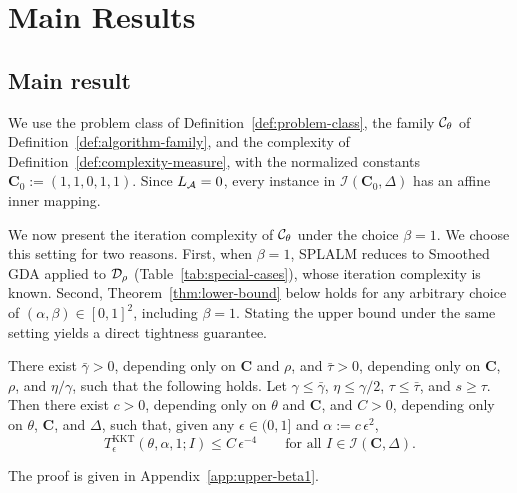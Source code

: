 \section{Main Results}
\label{sec:lower-bound}

\subsection{Main result}
\label{subsec:lb-main}

We use the problem class of Definition~\ref{def:problem-class}, the family
\(\mathcal{C}_\theta\) of Definition~\ref{def:algorithm-family}, and the complexity
of Definition~\ref{def:complexity-measure}, with the normalized constants
\(\mathbf C_0:=(1,1,0,1,1)\). Since \(L_{\mathcal{A}}=0\), every instance in
\(\mathcal I(\mathbf C_0,\Delta)\) has an affine inner mapping.

We now present the iteration complexity of \(\mathcal{C}_\theta\) under the choice
\(\beta=1\). We choose this setting for two reasons. First, when
\(\beta=1\), SPLALM reduces to Smoothed GDA applied to \(\mathcal{D}_\rho\)
(Table~\ref{tab:special-cases}), whose iteration complexity is known. Second,
Theorem~\ref{thm:lower-bound} below holds for any arbitrary choice of
\((\alpha,\beta)\in[0,1]^2\), including \(\beta=1\). Stating the upper bound
under the same setting yields a direct tightness guarantee.

\begin{theorem}[Iteration complexity of SPLALM with \(\beta=1\)]
\label{thm:upper-beta1}
There exist \(\bar\gamma>0\), depending only on \(\mathbf C\) and \(\rho\),
and \(\bar\tau>0\), depending only on \(\mathbf C\), \(\rho\), and
\(\eta/\gamma\), such that the following holds. Let \(\gamma\le\bar\gamma\),
\(\eta\le\gamma/2\), \(\tau\le\bar\tau\), and \(s\ge\tau\). Then there exist
\(c>0\), depending only on \(\theta\) and \(\mathbf C\), and \(C>0\),
depending only on \(\theta\), \(\mathbf C\), and \(\Delta\), such that, given
any \(\epsilon\in(0,1]\) and \(\alpha:=c\,\epsilon^2\),
\[
T^{\mathrm{KKT}}_\epsilon(\theta,\alpha,1;I)\le C\,\epsilon^{-4}
\qquad\text{for all } I\in\mathcal I(\mathbf C,\Delta).
\]
\end{theorem}
The proof is given in Appendix~\ref{app:upper-beta1}.

